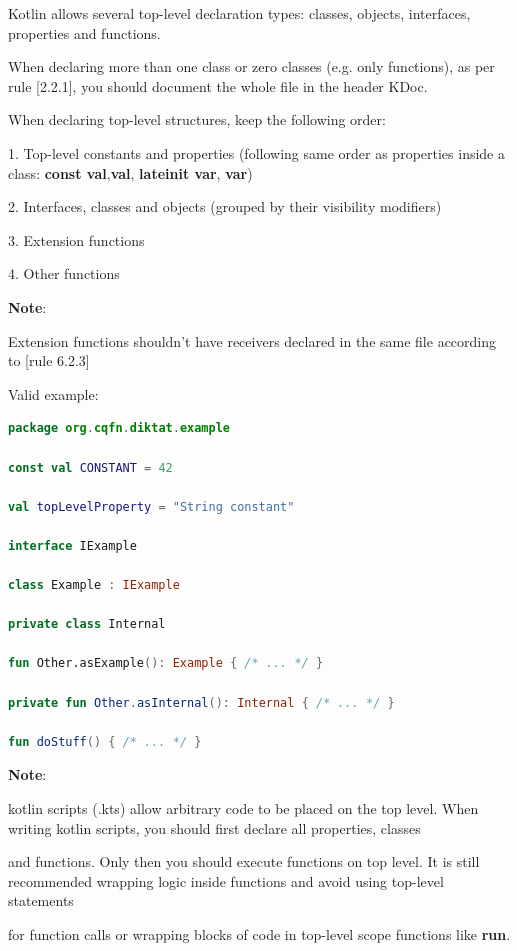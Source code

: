 \label{sec:3.1.5}

Kotlin allows several top-level declaration types: classes, objects, interfaces, properties and functions.

When declaring more than one class or zero classes (e.g. only functions), as per rule [2.2.1], you should document the whole file in the header KDoc.

When declaring top-level structures, keep the following order:

1. Top-level constants and properties (following same order as properties inside a class: \textbf{const val},\textbf{val}, \textbf{lateinit var}, \textbf{var})

2. Interfaces, classes and objects (grouped by their visibility modifiers)

3. Extension functions

4. Other functions



\textbf{Note}:

Extension functions shouldn't have receivers declared in the same file according to [rule 6.2.3]



Valid example:

\begin{lstlisting}[language=Kotlin]
package org.cqfn.diktat.example

const val CONSTANT = 42

val topLevelProperty = "String constant"

interface IExample

class Example : IExample

private class Internal

fun Other.asExample(): Example { /* ... */ }

private fun Other.asInternal(): Internal { /* ... */ }

fun doStuff() { /* ... */ }
\end{lstlisting}


\textbf{Note}:

kotlin scripts (.kts) allow arbitrary code to be placed on the top level. When writing kotlin scripts, you should first declare all properties, classes

and functions. Only then you should execute functions on top level. It is still recommended wrapping logic inside functions and avoid using top-level statements

for function calls or wrapping blocks of code in top-level scope functions like \textbf{run}.



